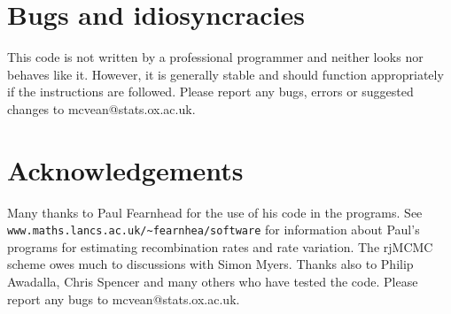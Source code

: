 \documentclass[a4paper,10pt,fullpage]{article}
\begin{document}
\section{Bugs and idiosyncracies}
This code is not written by a professional programmer and neither
looks nor behaves like it.  However, it is generally stable and
should function appropriately if the instructions are followed.
Please report any bugs, errors or suggested changes to
mcvean@stats.ox.ac.uk.

\section{Acknowledgements}
Many thanks to Paul Fearnhead for the use of his code in the
programs.  See \verb+www.maths.lancs.ac.uk/~fearnhea/software+ for
information about Paul's programs for estimating recombination
rates and rate variation.   The rjMCMC scheme owes much to
discussions with Simon Myers.  Thanks also to Philip Awadalla,
Chris Spencer and many others who have tested the code. Please
report any bugs to mcvean@stats.ox.ac.uk.
\newpage


\end{document}
